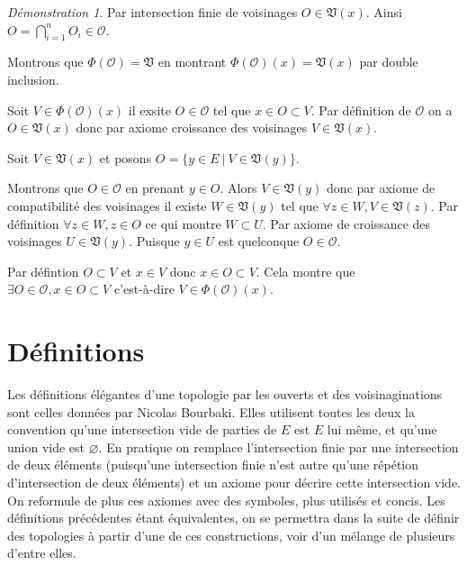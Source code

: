 \documentclass[a4paper, 11pt, french]{book}
\newenvironment{itemise}{\itemize}{\enditemize}
\theoremstyle{plain} %
\theoremstyle{definition} %
\theoremstyle{remark} %
\newtheorem*{demonstration}{Démonstration}
\newcommand{\1}{\mathds{1}}
\newcommand\vide{\varnothing}
\newcommand\ens[2]{\{#1 \ |\ #2\}}
\begin{document}
\begin{demonstration}
\begin{itemise}
\begin{itemise}
\begin{itemise}
				Par intersection finie de voisinages $O\in\mathfrak{V}(x)$.
				Ainsi $O=\bigcap_{i=1}^nO_i\in\mathscr{O}$.
			\end{itemise}
			\item Montrons que $\Phi(\mathscr{O})=\mathfrak{V}$ en montrant $\Phi(\mathscr{O})(x)=\mathfrak{V}(x)$ par double inclusion.
			\begin{itemise}
				\item Soit $V\in\Phi(\mathscr{O})(x)$ il exsite $O\in\mathscr{O}$ tel que $x\in O\subset V$.
				Par définition de $\mathscr{O}$ on a $O\in\mathfrak{V}(x)$ donc par axiome croissance des voisinages $V\in\mathfrak{V}(x)$.
				\item Soit $V\in\mathfrak{V}(x)$ et posons $O=\ens{y\in E}{V\in\mathfrak{V}(y)}$.
				\begin{itemise}
					\item Montrons que $O\in\mathscr{O}$ en prenant $y\in O$.
					Alors $V\in\mathfrak{V}(y)$ donc par axiome de compatibilité des voisinages il existe $W\in\mathfrak{V}(y)$ tel que $\forall z\in W, V\in\mathfrak{V}(z)$.
					Par définition $\forall z\in W, z\in O$ ce qui montre $W\subset U$.
					Par axiome de croissance des voisinages $U\in\mathfrak{V}(y)$.
					Puisque $y\in U$ est quelconque $O\in\mathscr{O}$.
					\item Par défintion $O\subset V$ et $x\in V$ donc $x\in O\subset V$.
				\end{itemise}
				Cela montre que $\exists O\in\mathscr{O}, x\in O\subset V$ c'est-à-dire $V\in\Phi(\mathscr{O})(x)$.
			\end{itemise}
		\end{itemise}
	\end{itemise}
\end{demonstration}

\section{Définitions}

Les définitions élégantes d'une topologie par les ouverts et des voisinaginations sont celles données par Nicolas Bourbaki.
Elles utilisent toutes les deux la convention qu'une intersection vide de parties de $E$ est $E$ lui même, et qu'une union vide est $\vide$.
En pratique on remplace l'intersection finie par une intersection de deux éléments (puisqu'une intersection finie n'est autre qu'une répétion d'intersection de deux éléments) et un axiome pour décrire cette intersection vide.
On reformule de plus ces axiomes avec des symboles, plus utilisés et concis.
Les définitions précédentes étant équivalentes, on se permettra dans la suite de définir des topologies à partir d'une de ces constructions, voir d'un mélange de plusieurs d'entre elles.
\end{document}
